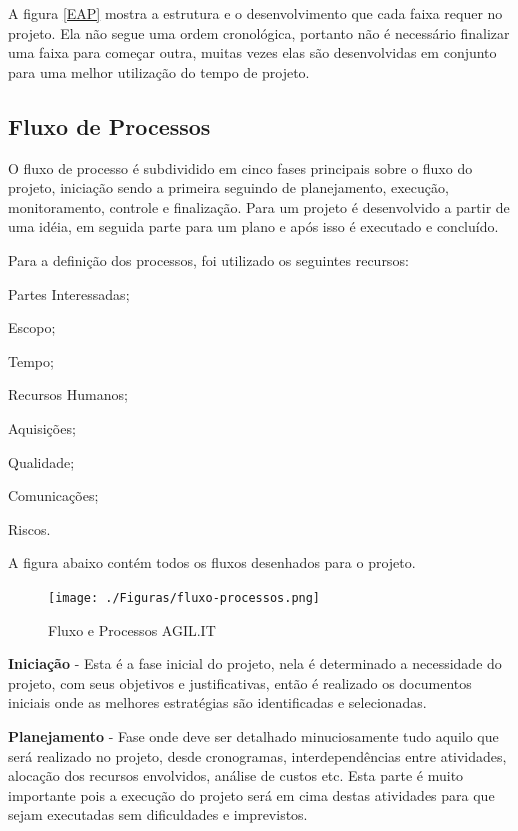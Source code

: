 {A figura \ref{EAP} mostra a estrutura e o desenvolvimento que cada faixa requer no projeto. Ela não segue uma ordem cronológica, portanto não é necessário finalizar uma faixa para começar outra, muitas vezes elas são desenvolvidas em conjunto para uma melhor utilização do tempo de projeto.

\subsection{Fluxo de Processos}

{O fluxo de processo é subdividido em cinco fases principais sobre o fluxo do projeto, iniciação sendo a primeira seguindo de planejamento, execução, monitoramento, controle e finalização. Para \cite{PMG2018} um projeto é desenvolvido a partir de uma idéia, em seguida parte para um plano e após isso é executado e concluído.}

Para a definição dos processos, foi utilizado os seguintes recursos:

\begin{subalineas}
	\item {Partes Interessadas};
	\item {Escopo};
	\item {Tempo};
	\item {Recursos Humanos};
	\item {Aquisições};
	\item {Qualidade};
	\item {Comunicações};
	\item {Riscos}.
\end{subalineas}

A figura abaixo contém todos os fluxos desenhados para o projeto.

\newpage
\begin{figure}[htb]
	\caption{\label{Fluxo-Processos}Fluxo e Processos AGIL.IT}
	\begin{center}
		\texttt{[image: ./Figuras/fluxo-processos.png]}
	\end{center}
\end{figure}



{\textbf{Iniciação} - Esta é a fase inicial do projeto, nela é determinado a necessidade do projeto, com seus objetivos e justificativas, então é realizado os documentos iniciais onde as melhores estratégias são identificadas e selecionadas.}

{\textbf{Planejamento} - Fase onde deve ser detalhado minuciosamente tudo aquilo que será realizado no projeto, desde cronogramas, interdependências entre atividades, alocação dos recursos envolvidos, análise de custos etc. Esta parte é muito importante pois a execução do projeto será em cima destas atividades para que sejam executadas sem dificuldades e imprevistos.}

}
